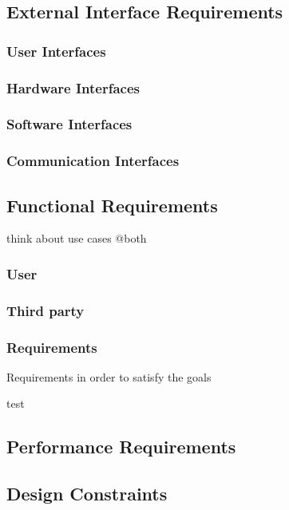 \subsection{External Interface Requirements}
\subsubsection{User Interfaces}
\subsubsection{Hardware Interfaces}
\subsubsection{Software Interfaces}
\subsubsection{Communication Interfaces}


\subsection{Functional  Requirements}


think about use cases @both

\subsubsection{User}
\subsubsection{Third party}

\subsubsection{Requirements}
Requirements in order to satisfy the goals
\begin{enumerate}
   test
\end{enumerate}



\subsection{Performance Requirements}


\subsection{Design Constraints}%


